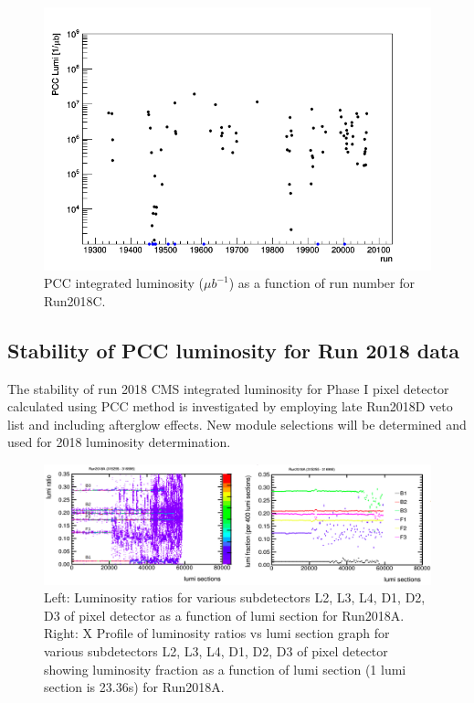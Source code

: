 \begin{figure}[H]
  \centering
  \includegraphics[width=0.52\columnwidth]{./runs_2018C.png}
  \caption{PCC integrated luminosity ($\mu b^{-1}$) as a function of run number for Run2018C.}
  \label{fig:CMS}
\end{figure}


\subsection{Stability of PCC luminosity for Run 2018 data}

The stability of run 2018 CMS integrated luminosity for Phase I pixel detector calculated using PCC method is investigated by employing late Run2018D veto list and including afterglow effects. New module selections will be determined and used for 2018 luminosity determination. 
\begin{figure}[H]
  \centering
  \includegraphics[width=1\columnwidth]{./t25ld-kgsjf.png}
  \caption{Left: Luminosity ratios for various subdetectors L2, L3, L4, D1, D2, D3 of pixel detector as a function of lumi section for Run2018A. Right: X Profile of luminosity ratios vs lumi section graph for various subdetectors L2, L3, L4, D1, D2, D3 of pixel detector showing luminosity fraction as a function of lumi section (1 lumi section is 23.36s) for Run2018A.}
  \label{fig:CMS}
\end{figure}


